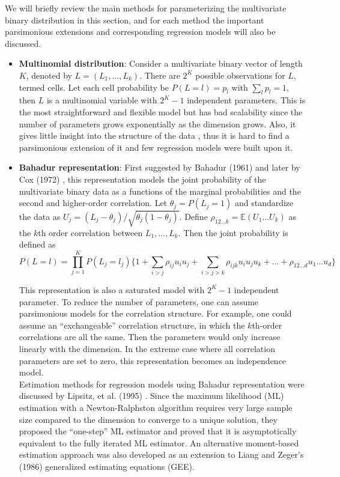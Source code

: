 \documentclass[11 pt, a4paper]{article}  %
\begin{document}
We will briefly review the main methods for parameterizing the multivariate binary distribution in this section, and for each method the important parsimonious extensions and corresponding regression models will also be discussed.\\

\begin{itemize}
\item {\bf Multinomial distribution}: 
Consider a multivariate binary vector of length $K$, denoted by $L=(L_1,\ldots,L_k)$. There are $2^K$ possible observations for $L$, termed cells. Let each cell probability be $P(L=l) = p_l$ with $\sum_l p_l = 1$, then $L$ is a multinomial variable with $2^K -1$ independent parameters. This is the most straightforward and flexible model but has bad scalability since the number of parameters grows exponentially as the dimension grows. Also, it gives little insight into the structure of the data \cite{cox1972analysis}, thus it is hard to find a parsimonious extension of it and few regression models were built upon it.\\


\item {\bf Bahadur representation}: 
First suggested by Bahadur (1961) \cite{bahadur1961representation}  and later by Cox (1972) \cite{cox1972analysis}, this representation models the joint probability of the multivariate binary data as a functions of the marginal probabilities and the second and higher-order correlation. Let $\theta_j = P(L_j=1)$ and standardize the data as $U_j=(L_j-\theta_j)/\sqrt{\theta_j(1-\theta_j)}$. Define $\rho_{12\ldots k}=\mathbb{E}(U_1\ldots U_k)$ as the $k$th order correlation between $L_1,\ldots,L_k$. Then the joint probability is defined as 
\[P(L=l)=\prod_{j=1}^K P(L_j=l_j) \Big \{ 1+ \sum_{i>j}\rho_{ij}u_i u_j +  
\sum_{i>j>k}\rho_{ijk}u_i u_j u_k + \ldots + \rho_{12 \ldots d}u_1\ldots u_d \Big \}\]

This representation is also a saturated model with $2^K -1$ independent parameter. To reduce the number of parameters, one can assume parsimonious models for the correlation structure. For example, one could assume an ``exchangeable'' correlation structure, in which the $k$th-order correlations are all the same. Then the parameters would only increase linearly with the dimension. In the extreme case where all correlation parameters are set to zero, this representation becomes an independence model.\\

Estimation methods for regression models using Bahadur representation were discussed by Lipsitz, et al. (1995) \cite{lipsitz1995estimation}. Since the maximum likelihood (ML) estimation with a Newton-Ralphston algorithm requires very large sample size compared to the dimension to converge to a unique solution, they proposed the ``one-step'' ML estimator and proved that it is asymptotically equivalent to the fully iterated ML estimator. An alternative moment-based estimation approach\cite{lipsitz1995estimation} was also developed as an extension to Liang and Zeger's (1986) generalized estimating equations (GEE)\cite{liang1986longitudinal}.\\


\end{itemize}
\end{document}
